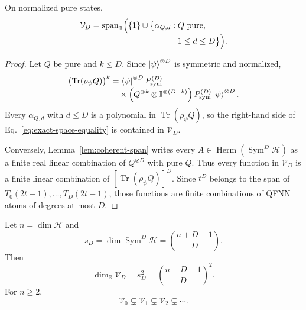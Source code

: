 \documentclass[pdflatex,sn-mathphys,NameDate,iicol]{sn-jnl}
\newcommand{\Tr}{\operatorname{Tr}}
\newcommand{\id}{\mathbb{I}}
\newcommand{\R}{\mathbb{R}}
\newcommand{\Herm}{\operatorname{Herm}}
\newcommand{\Sym}{\operatorname{Sym}}
\newcommand{\cH}{\mathcal{H}}
\newcommand{\cV}{\mathcal{V}}
\begin{document}
\begin{theorem}
\label{thm:exact-degree-space}
On normalized pure states,
\begin{equation}
  \begin{aligned}
  \cV_D=\operatorname{span}_{\R}\Bigl(
    \{1\}\cup
    \bigl\{\alpha_{Q,d}:{}&Q\ \text{pure},\\[-1mm]
                    &1\le d\le D\bigr\}\Bigr).
  \end{aligned}
  \label{eq:exact-space-equality}
\end{equation}
\end{theorem}

\begin{proof}
Let $Q$ be pure and $k\le D$. Since $\ket\psi^{\otimes D}$ is symmetric
and normalized,
\begin{align}
  \bigl(\Tr(\rho_\psi Q)\bigr)^k
  &=
  \bra{\psi}^{\otimes D}
  P_{\rm sym}^{(D)}\nonumber\\[-1mm]
  &\quad\times
  \left(Q^{\otimes k}\otimes\id^{\otimes(D-k)}\right)
  P_{\rm sym}^{(D)}
  \ket{\psi}^{\otimes D}.
  \label{eq:lower-to-D}
\end{align}
Every $\alpha_{Q,d}$ with $d\le D$ is a polynomial in
$\Tr(\rho_\psi Q)$, so the right-hand side of
Eq.~\eqref{eq:exact-space-equality} is contained in $\cV_D$.

Conversely, Lemma~\ref{lem:coherent-span} writes every
$A\in\Herm(\Sym^D\cH)$ as a finite real linear combination of
$Q^{\otimes D}$ with pure $Q$. Thus every function in $\cV_D$ is a finite
linear combination of
$[\Tr(\rho_\psi Q)]^D$. Since $t^D$ belongs to the span of
$T_0(2t-1),\ldots,T_D(2t-1)$, those functions are finite combinations of
QFNN atoms of degrees at most $D$.
\end{proof}

\begin{corollary}
\label{cor:dimension-hierarchy}
Let $n=\dim\cH$ and
\begin{equation}
  s_D=\dim\Sym^D\cH=\binom{n+D-1}{D}.
\end{equation}
Then
\begin{equation}
  \dim_{\R}\cV_D=s_D^2
  =
  \binom{n+D-1}{D}^{\!2}.
  \label{eq:VD-dimension}
\end{equation}
For $n\ge2$,
\begin{equation}
  \cV_0\subsetneq\cV_1\subsetneq
  \cV_2\subsetneq\cdots .
  \label{eq:strict-hierarchy}
\end{equation}
\end{corollary}
\end{document}

